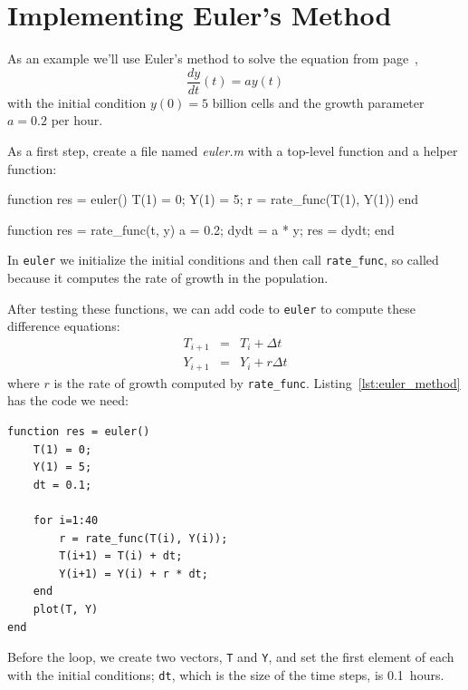 

\section{Implementing Euler's Method}

As an example we'll use Euler's method to solve the equation from page~\pageref{diffeq},
\[ \frac{dy}{dt}(t) = a y(t) \]
with the initial condition $y(0) = 5$ billion cells and
the growth parameter $a = 0.2$ per hour.


As a first step, create a file named \emph{euler.m} with a top-level function and a helper function:

\begin{code}
function res = euler()
    T(1) = 0;
    Y(1) = 5;
    r = rate_func(T(1), Y(1))
end

function res = rate_func(t, y)
   a = 0.2;
   dydt = a * y;
   res = dydt;
end
\end{code}

In \lstinline{euler} we initialize the initial conditions and then call \lstinline{rate_func}, so called because it computes the rate of growth in the population.


After testing these functions, we can add code to \lstinline{euler} to compute these difference equations:
\begin{eqnarray*}
T_{i+1} &=& T_i + \Delta t             \\
Y_{i+1} &=& Y_i + r \Delta t
\end{eqnarray*}
%
where $r$ is the rate of growth computed by \lstinline{rate_func}.
Listing~\ref{lst:euler_method} has the code we need:

\begin{lstlisting}[caption={A function implementing Euler's method}, label={lst:euler_method}]
function res = euler()
    T(1) = 0;
    Y(1) = 5;
    dt = 0.1;

    for i=1:40
        r = rate_func(T(i), Y(i));
        T(i+1) = T(i) + dt;
        Y(i+1) = Y(i) + r * dt;
    end
    plot(T, Y)
end
\end{lstlisting}

Before the loop, we create two vectors, \lstinline{T} and \lstinline{Y}, and set the first element of each with the initial conditions;  \lstinline{dt}, which is the size of the time steps, is 0.1~hours.

